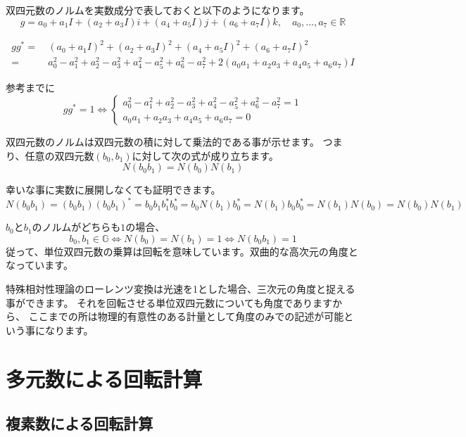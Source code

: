 \documentclass[a4paper,12pt,notitlepage]{jsreport}
\begin{document}
双四元数のノルムを実数成分で表しておくと以下のようになります。
\begin{equation}
g=a_0+a_1I+(a_2+a_3I)i+(a_4+a_5I)j+(a_6+a_7I)k,\quad a_0,..., a_7\in\mathbb{R}
\end{equation}

\begin{equation}
\begin{split}
gg^*=~&(a_0+a_1I)^2+(a_2+a_3I)^2+(a_4+a_5I)^2+(a_6+a_7I)^2\\
=~&a_0^2-a_1^2+a_2^2-a_3^2+a_4^2-a_5^2+a_6^2-a_7^2+2(a_0a_1+a_2a_3+a_4a_5+a_6a_7)I
\end{split}
\end{equation}

参考までに
\begin{equation}
gg^*=1\iff
\begin{cases}
a_0^2-a_1^2+a_2^2-a_3^2+a_4^2-a_5^2+a_6^2-a_7^2=1\\
a_0a_1+a_2a_3+a_4a_5+a_6a_7=0
\end{cases}
\end{equation}

双四元数のノルムは双四元数の積に対して乗法的である事が示せます。
つまり、任意の双四元数$(b_0,b_1)$に対して次の式が成り立ちます。
\begin{equation}
N(b_0b_1)=N(b_0)N(b_1)
\end{equation}

幸いな事に実数に展開しなくても証明できます。
\begin{equation}
N(b_0b_1)=(b_0b_1)(b_0b_1)^*=b_0b_1b_1^*b_0^*=b_0N(b_1)b_0^*=N(b_1)b_0b_0^*=N(b_1)N(b_0)=N(b_0)N(b_1)
\end{equation}

$b_0$と$b_1$のノルムがどちらも$1$の場合、
\begin{equation}
b_0,b_1\in\mathbb{G}\iff N(b_0)=N(b_1)=1\iff N(b_0b_1)=1
\end{equation}
従って、単位双四元数の乗算は回転を意味しています。双曲的な高次元の角度となっています。

特殊相対性理論のローレンツ変換は光速を1とした場合、三次元の角度と捉える事ができます。
それを回転させる単位双四元数についても角度でありますから、
ここまでの所は物理的有意性のある計量として角度のみでの記述が可能という事になります。

\chapter{多元数による回転計算}

\section{複素数による回転計算}
\end{document}
